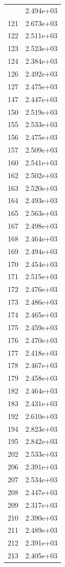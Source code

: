 \documentclass[12pt]{article}
\begin{document}
\begin{longtable}{@{}cc@{}}
\bottomrule
\endlastfoot
120 & 2.494e+03 \\
121 & 2.673e+03 \\
122 & 2.511e+03 \\
123 & 2.523e+03 \\
124 & 2.384e+03 \\
126 & 2.492e+03 \\
127 & 2.475e+03 \\
147 & 2.447e+03 \\
150 & 2.519e+03 \\
155 & 2.533e+03 \\
156 & 2.475e+03 \\
157 & 2.509e+03 \\
160 & 2.541e+03 \\
162 & 2.502e+03 \\
163 & 2.520e+03 \\
164 & 2.493e+03 \\
165 & 2.563e+03 \\
167 & 2.498e+03 \\
168 & 2.464e+03 \\
169 & 2.494e+03 \\
170 & 2.454e+03 \\
171 & 2.515e+03 \\
172 & 2.476e+03 \\
173 & 2.486e+03 \\
174 & 2.465e+03 \\
175 & 2.459e+03 \\
176 & 2.470e+03 \\
177 & 2.418e+03 \\
178 & 2.467e+03 \\
179 & 2.458e+03 \\
182 & 2.464e+03 \\
183 & 2.431e+03 \\
192 & 2.610e+03 \\
194 & 2.823e+03 \\
195 & 2.842e+03 \\
202 & 2.533e+03 \\
206 & 2.391e+03 \\
207 & 2.534e+03 \\
208 & 2.447e+03 \\
209 & 2.317e+03 \\
210 & 2.390e+03 \\
211 & 2.489e+03 \\
212 & 2.391e+03 \\
213 & 2.405e+03 \\

\end{longtable}
\end{document}
